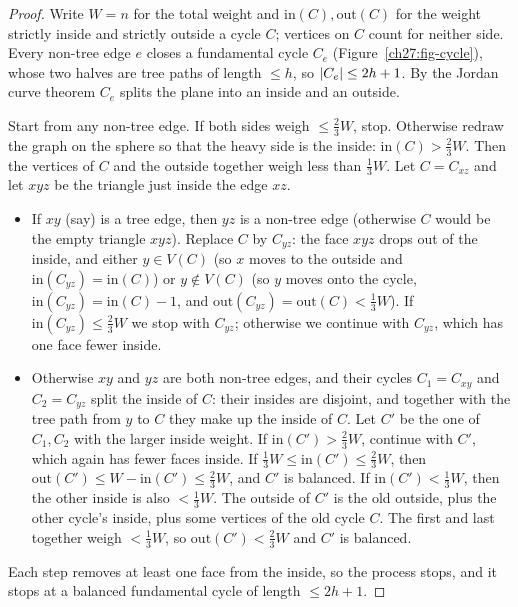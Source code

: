 \begin{proof}
Write $W=n$ for the total weight and $\mathrm{in}(C),\mathrm{out}(C)$ for the weight
strictly inside and strictly outside a cycle $C$; vertices on $C$ count for neither
side. Every non-tree edge $e$ closes a fundamental cycle $C_e$ (Figure~\ref{ch27:fig-cycle}),
whose two halves are tree paths of length $\le h$, so $\lvert C_e\rvert\le 2h+1$. By the
Jordan curve theorem $C_e$ splits the plane into an inside and an outside.

Start from any non-tree edge. If both sides weigh $\le\tfrac23 W$, stop. Otherwise
redraw the graph on the sphere so that the heavy side is the inside:
$\mathrm{in}(C)>\tfrac23 W$. Then the vertices of $C$ and the outside together
weigh less than $\tfrac13 W$. Let $C=C_{xz}$ and let $xyz$ be the triangle just inside the
edge $xz$.
\begin{itemize}
  \item If $xy$ (say) is a tree edge, then $yz$ is a non-tree edge (otherwise $C$
        would be the empty triangle $xyz$). Replace $C$ by $C_{yz}$: the face $xyz$
        drops out of the inside, and either $y\in V(C)$ (so $x$ moves to the outside
        and $\mathrm{in}(C_{yz})=\mathrm{in}(C)$) or $y\notin V(C)$ (so $y$ moves onto
        the cycle, $\mathrm{in}(C_{yz})=\mathrm{in}(C)-1$, and
        $\mathrm{out}(C_{yz})=\mathrm{out}(C)<\tfrac13 W$). If
        $\mathrm{in}(C_{yz})\le\tfrac23 W$ we stop with $C_{yz}$; otherwise we continue
        with $C_{yz}$, which has one face fewer inside.
  \item Otherwise $xy$ and $yz$ are both non-tree edges, and their cycles $C_1=C_{xy}$
        and $C_2=C_{yz}$ split the inside of $C$: their insides are disjoint, and
        together with the tree path from $y$ to $C$ they make up the inside of $C$.
        Let $C'$ be the one of $C_1,C_2$ with the larger inside weight. If
        $\mathrm{in}(C')>\tfrac23 W$, continue with $C'$, which again has fewer faces
        inside. If $\tfrac13 W\le \mathrm{in}(C')\le\tfrac23 W$, then
        $\mathrm{out}(C')\le W-\mathrm{in}(C')\le\tfrac23 W$, and $C'$ is
        balanced. If $\mathrm{in}(C')<\tfrac13 W$, then the other inside is
        also $<\tfrac13 W$. The outside of $C'$ is the old outside, plus the
        other cycle's inside, plus some vertices of the old cycle $C$. The first and
        last together weigh $<\tfrac13 W$, so $\mathrm{out}(C')<\tfrac23 W$ and
        $C'$ is balanced.
\end{itemize}
Each step removes at least one face from the inside, so the process stops, and it
stops at a balanced fundamental cycle of length $\le 2h+1$.
\end{proof}

